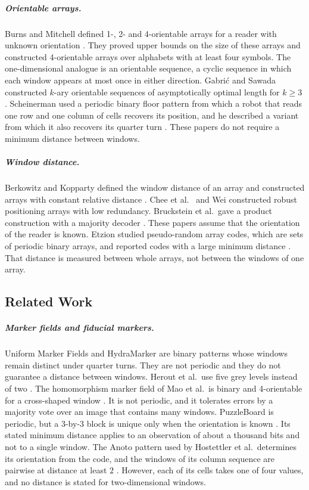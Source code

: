 \documentclass{lipics-v2021}
\begin{document}
\subparagraph*{Orientable arrays.}
Burns and Mitchell defined 1-, 2- and 4-orientable arrays for a reader with unknown orientation \cite{burns1993coding}.
They proved upper bounds on the size of these arrays and constructed 4-orientable arrays over alphabets with at least four symbols.
The one-dimensional analogue is an orientable sequence, a cyclic sequence in which each window appears at most once in either direction.
Gabri\'c and Sawada constructed $k$-ary orientable sequences of asymptotically optimal length for $k \geq 3$ \cite{gabric2025constructing}.
Scheinerman used a periodic binary floor pattern from which a robot that reads one row and one column of cells recovers its position, and he described a variant from which it also recovers its quarter turn \cite{scheinerman2001determining}.
These papers do not require a minimum distance between windows.

\subparagraph*{Window distance.}
Berkowitz and Kopparty defined the window distance of an array and constructed arrays with constant relative distance \cite{berkowitz2016robust}.
Chee et al.\ \cite{chee2022robust} and Wei \cite{wei2021nearly} constructed robust positioning arrays with low redundancy.
Bruckstein et al.\ gave a product construction with a majority decoder \cite{bruckstein2012simple}.
These papers assume that the orientation of the reader is known.
Etzion studied pseudo-random array codes, which are sets of periodic binary arrays, and reported codes with a large minimum distance \cite{etzion2024pseduo}.
That distance is measured between whole arrays, not between the windows of one array.

\subsection{Related Work}
\label{sec:background_related}

\subparagraph*{Marker fields and fiducial markers.}
Uniform Marker Fields \cite{szentandrasi2012uniform} and HydraMarker \cite{zhu2022hydramarker} are binary patterns whose windows remain distinct under quarter turns.
They are not periodic and they do not guarantee a distance between windows.
Herout et al.\ use five grey levels instead of two \cite{herout2013five}.
The homomorphism marker field of Mao et al.\ is binary and 4-orientable for a cross-shaped window \cite{mao2025homomorphism}.
It is not periodic, and it tolerates errors by a majority vote over an image that contains many windows.
PuzzleBoard is periodic, but a $3$-by-$3$ block is unique only when the orientation is known \cite{stelldinger2024puzzleboard}.
Its stated minimum distance applies to an observation of about a thousand bits and not to a single window.
The Anoto pattern used by Hostettler et al.\ determines its orientation from the code, and the windows of its column sequence are pairwise at distance at least $2$ \cite{hostettler2016real}.
However, each of its cells takes one of four values, and no distance is stated for two-dimensional windows.
\end{document}

